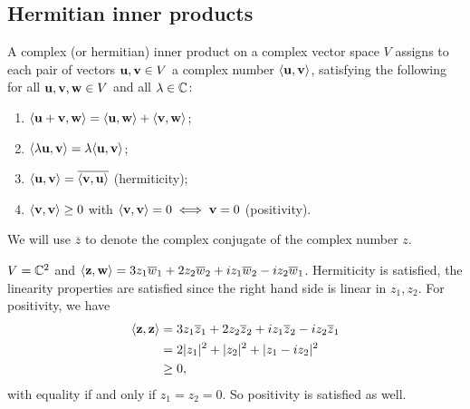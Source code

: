 \documentclass[10pt, a4paper]{article}
\begin{document}
\subsection{Hermitian inner products}
\begin{definition}
    A complex
    (or hermitian)
    inner product on a complex vector space $V$ assigns to each pair of vectors $\mathbf{u}, \mathbf{v} \in V$ a complex number $\langle \mathbf{u}, \mathbf{v}\rangle$,
    satisfying the following for all $\mathbf{u}, \mathbf{v}, \mathbf{w} \in V$ and all $\lambda \in \mathbb{C}$:
    \begin{enumerate}[label = (\roman*)]
        \item $\langle\mathbf{u} + \mathbf{v}, \mathbf{w}\rangle = \langle\mathbf{u}, \mathbf{w}\rangle + \langle\mathbf{v}, \mathbf{w}\rangle$;

        \item $\langle\lambda\mathbf{u}, \mathbf{v}\rangle = \lambda\langle\mathbf{u}, \mathbf{v}\rangle$;

        \item $\langle\mathbf{u}, \mathbf{v}\rangle = \overline{\langle \mathbf{v}, \mathbf{u}\rangle}$
        (hermiticity);

        \item $\langle \mathbf{v}, \mathbf{v}\rangle \geq 0$ with $\langle\mathbf{v}, \mathbf{v}\rangle = 0 \iff \mathbf{v} = 0$
        (positivity).
    \end{enumerate}
\end{definition}
\begin{remark}
    We will use $\overline{z}$ to denote the complex conjugate of the complex number $z$.
\end{remark}

\begin{example}
    $V = \mathbb{C} ^ 2$ and $\langle\mathbf{z}, \mathbf{w}\rangle = 3z_1\overline{w}_1 + 2z_2\overline{w}_2 + iz_1\overline{w}_2 - iz_2\overline{w}_1$.
    Hermiticity is satisfied,
    the linearity properties are satisfied since the right hand side is linear in $z_1, z_2$.
    For positivity,
    we have
    \begin{align*}
        \langle\mathbf{z}, \mathbf{z}\rangle &= 3z_1\overline{z}_1 + 2z_2\overline{z}_2 + iz_1\overline{z}_2 - iz_2\overline{z}_1 \\
        &= 2|z_1| ^ 2 + |z_2| ^ 2 + |z_1 - iz_2| ^ 2 \\
        &\geq 0,
    \end{align*}
    with equality if and only if $z_1 = z_2 = 0$.
    So positivity is satisfied as well.
\end{example}
\end{document}

